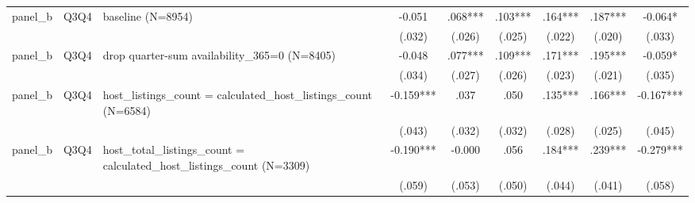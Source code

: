 \begin{tabular}{lllcccccc}
\\
panel\_b & Q3Q4 & baseline (N=8954) & -0.051 & .068*** & .103*** & .164*** & .187*** & -0.064*
\\
 &  &  & (.032) & (.026) & (.025) & (.022) & (.020) & (.033)
\\
panel\_b & Q3Q4 & drop quarter-sum availability\_365=0 (N=8405) & -0.048 & .077*** & .109*** & .171*** & .195*** & -0.059*
\\
 &  &  & (.034) & (.027) & (.026) & (.023) & (.021) & (.035)
\\
panel\_b & Q3Q4 & host\_listings\_count = calculated\_host\_listings\_count (N=6584) & -0.159*** & .037 & .050 & .135*** & .166*** & -0.167***
\\
 &  &  & (.043) & (.032) & (.032) & (.028) & (.025) & (.045)
\\
panel\_b & Q3Q4 & host\_total\_listings\_count = calculated\_host\_listings\_count (N=3309) & -0.190*** & -0.000 & .056 & .184*** & .239*** & -0.279***
\\
 &  &  & (.059) & (.053) & (.050) & (.044) & (.041) & (.058)
\\
\hline
\end{tabular}
